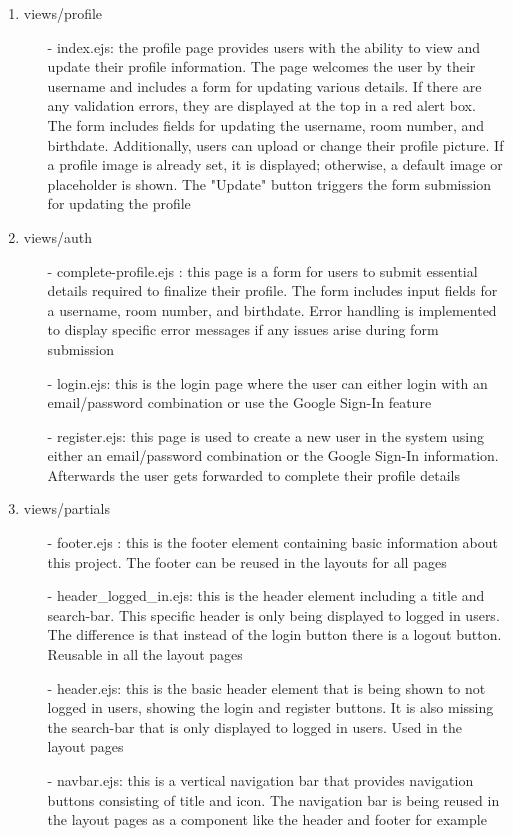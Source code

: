 \documentclass[conference]{IEEEtran}
\begin{document}
\begin{enumerate}
\begin{enumerate}
        \item views/profile
        \begin{itemize}
            \item[-] index.ejs: the profile page provides users with the ability to view and update their profile information. The page welcomes the user by their username and includes a form for updating various details. If there are any validation errors, they are displayed at the top in a red alert box. The form includes fields for updating the username, room number, and birthdate. Additionally, users can upload or change their profile picture. If a profile image is already set, it is displayed; otherwise, a default image or placeholder is shown. The "Update" button triggers the form submission for updating the profile
        \end{itemize}

        \item views/auth
        \begin{itemize}
            \item[-] complete-profile.ejs : this page is a form for users to submit essential details required to finalize their profile. The form includes input fields for a username, room number, and birthdate. Error handling is implemented to display specific error messages if any issues arise during form submission
            \item[-] login.ejs: this is the login page where the user can either login with an email/password combination or use the Google Sign-In feature
            \item[-] register.ejs: this page is used to create a new user in the system using either an email/password combination or the Google Sign-In information. Afterwards the user gets forwarded to complete their profile details
        \end{itemize}

        \item views/partials
        \begin{itemize}
            \item[-] footer.ejs : this is the footer element containing basic information about this project. The footer can be reused in the layouts for all pages
            \item[-] header\_logged\_in.ejs: this is the header element including a title and search-bar. This specific header is only being displayed to logged in users. The difference is that instead of the login button there is a logout button. Reusable in all the layout pages
            \item[-] header.ejs: this is the basic header element that is being shown to not logged in users, showing the login and register buttons. It is also missing the search-bar that is only displayed to logged in users. Used in the layout pages
            \item[-] navbar.ejs: this is a vertical navigation bar that provides navigation buttons consisting of title and icon. The navigation bar is being reused in the layout pages as a component like the header and footer for example
        \end{itemize}


\end{enumerate}
\end{enumerate}
\end{document}
